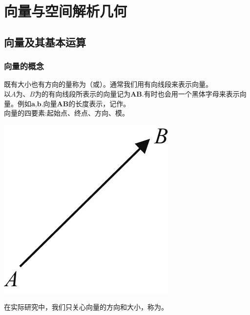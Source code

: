 \chapter{向量与空间解析几何}
\thispagestyle{empty}
\section{向量及其基本运算}
\subsection{向量的概念}
\vspace*{-0.5em}
\noindent
\begin{minipage}{0.6\linewidth}
\hspace*{2em} 既有大小也有方向的量称为（或）。通常我们用有向线段来表示向量。\\
\hspace*{2em} 以$A$为、$B$为的有向线段所表示的向量记为$\boldsymbol{AB}$.有时也会用一个黑体字母来表示向量。例如$\boldsymbol{a}$,$\boldsymbol{b}$.向量$\boldsymbol{AB}$的长度表示，记作。\\
\hspace*{2em} 向量的四要素:起始点、终点、方向、模。
\end{minipage}
\begin{minipage}{0.4\linewidth}
	\centering
	\includegraphics[width = 0.45\linewidth]{pic/C-5/vec}
	\vspace*{-1em}
	\label{向量示意图}
\end{minipage}

在实际研究中，我们只关心向量的方向和大小，称为。

